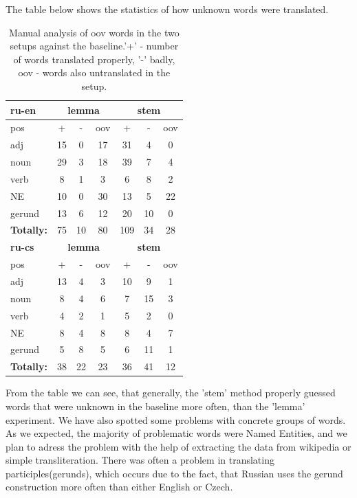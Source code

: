\documentclass[11pt,letterpaper]{article}
\begin{document}
The table below shows the statistics of how unknown words were translated.
\begin{table}
\begin{center}
\begin{tabular}{|l|ccc|ccc|}
  \hline
 \textbf{ru-en} & \multicolumn{3}{|c|}{\textbf{lemma}} & \multicolumn{3}{c|}{\textbf{stem}} \\ \hline
  pos      & +      & -      & oov & +      & -      & oov  \\ \hline
  adj      & 15     & 0      & 17  & 31     & 4      & 0 \\
  noun     & 29     & 3      & 18  & 39     & 7      & 4 \\ 
  verb     & 8      & 1      & 3   & 6      &8       & 2 \\
  NE       &10      & 0      & 30  & 13     & 5      & 22 \\
 gerund     &13      & 6      & 12  & 20     &10      & 0 \\ \hline
\textbf{Totally:} & 75 & 10& 80 &  109 & 34 &28 \\ \hline \hline
 \textbf{ru-cs} & \multicolumn{3}{|c|}{\textbf{lemma}} & \multicolumn{3}{|c|}{\textbf{stem}} \\ \hline
 pos  & + & -   & oov & +  & - & oov\\ \hline
 adj  & 13& 4   & 3   & 10 & 9 & 1 \\ \hline
 noun & 8& 4    &6    & 7  &15 &3 \\ \hline
 verb & 4 & 2   & 1   & 5  & 2 & 0 \\ \hline
 NE   & 8 & 4   & 8   & 8  &4  & 7 \\ \hline %
gerund& 5  & 8  & 5   & 6  &11 & 1 \\ \hline
\textbf{Totally:} & 38& 22 & 23& 36 & 41 & 12 \\ 
\hline
\end{tabular}
\end{center}
\caption{Manual analysis of oov words in the two setups against the baseline.'+' - number of words translated properly,
'-' badly, oov - words also untranslated in the setup.}
\label{tab:ruen-manual}
\end{table}


From the table we can see, that generally, the 'stem' method properly guessed
words that were unknown in the baseline more often, than the 'lemma' experiment.
We have also spotted some problems with concrete groups of words. %
As we expected, the majority of problematic words were Named Entities, and we plan to adress the problem with the help of extracting the data from wikipedia or
simple transliteration.
There was often a problem in translating participles(gerunds), which occurs
due to the fact, that Russian uses the gerund construction more often than
either English or Czech.
\end{document}
